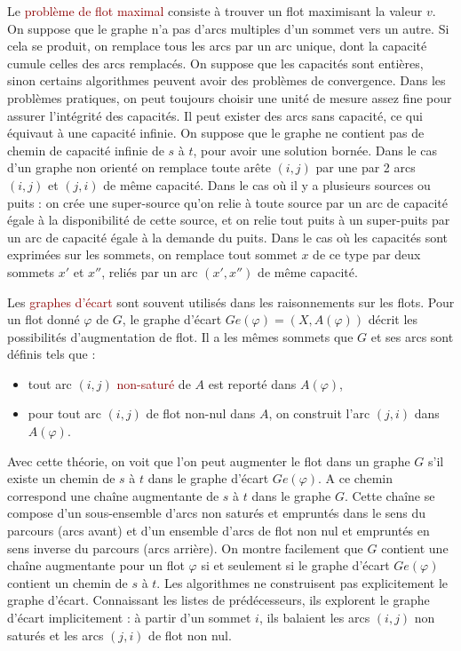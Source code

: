 \documentclass{article}
\newcommand{\red}[1]{\textcolor{darkred}{#1}}
\begin{document}
Le \red{problème de flot maximal} consiste à trouver un flot maximisant la valeur $v$. On suppose que le graphe n’a pas d’arcs multiples d’un sommet vers un autre. Si cela se 
produit, on remplace tous les arcs par un arc unique, dont la capacité cumule celles des arcs remplacés. On suppose que les capacités sont entières, sinon certains algorithmes
peuvent avoir des problèmes de convergence. Dans les problèmes pratiques, on peut toujours choisir une unité de mesure assez fine pour assurer l’intégrité des capacités. Il peut 
exister des arcs sans capacité, ce qui équivaut à une capacité infinie. On suppose que le graphe ne contient pas de chemin de capacité infinie de $s$ à $t$, pour avoir une solution 
bornée. Dans le cas d'un graphe non orienté on remplace toute arête $(i,j)$ par une par 2 arcs $(i,j)$ et $(j,i)$ de même capacité. Dans le cas où il y a plusieurs sources ou puits :
on crée une super-source qu’on relie à toute source par un arc de capacité égale à la disponibilité de cette source, et on relie tout puits à un super-puits par un arc de capacité égale 
à la demande du puits. Dans le cas où les capacités sont exprimées sur les sommets, on remplace tout sommet $x$ de ce type par deux sommets $x'$ et $x''$, reliés par un arc 
$(x',x'')$ de même capacité.

Les \red{graphes d'écart} sont souvent utilisés dans les raisonnements sur les flots. Pour un flot donné $\varphi$ de $G$, le graphe d’écart $Ge(\varphi) = (X, A(\varphi))$ décrit 
les possibilités d’augmentation de flot. Il a les mêmes sommets que $G$ et ses arcs sont définis tels que :
\begin{itemize}
\item tout arc $(i,j)$ \red{non-saturé} de $A$ est reporté dans $A(\varphi)$,
\item pour tout arc $(i,j)$ de flot non-nul dans $A$, on construit l'arc $(j,i)$ dans $A(\varphi)$.
\end{itemize}
Avec cette théorie, on voit que l'on peut augmenter le flot dans un graphe $G$ s’il existe un chemin de $s$ à $t$ dans le graphe d’écart $Ge(\varphi)$. A ce chemin correspond une
chaîne augmentante de $s$ à $t$ dans le graphe $G$. Cette chaîne se compose d’un sous-ensemble d’arcs non saturés et empruntés dans le sens du parcours (arcs avant) et d’un 
ensemble d’arcs de flot non nul et empruntés en sens inverse du parcours (arcs arrière). On montre facilement que $G$ contient une chaîne augmentante pour un flot $\varphi$ si 
et seulement si le graphe d’écart $Ge(\varphi)$ contient un chemin de $s$ à $t$. Les algorithmes ne construisent pas explicitement le graphe d’écart. Connaissant les listes de 
prédécesseurs, ils explorent le graphe d’écart implicitement : à partir d’un sommet $i$, ils balaient les arcs $(i,j)$ non saturés et les arcs $(j,i)$ de flot non nul. \\
\end{document}
